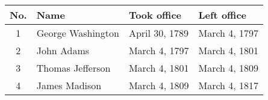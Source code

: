 \begin{tabular}{c|lll}
	No. & Name & Took office & Left office\\
	\hline
	\hline
	1 & George Washington & April 30, 1789 & March 4, 1797\\
	2 & John Adams & March 4, 1797 & March 4, 1801\\
	3 & Thomas Jefferson & March 4, 1801 & March 4, 1809\\
	4 & James Madison & March 4, 1809 & March 4, 1817\\
\end{tabular}
